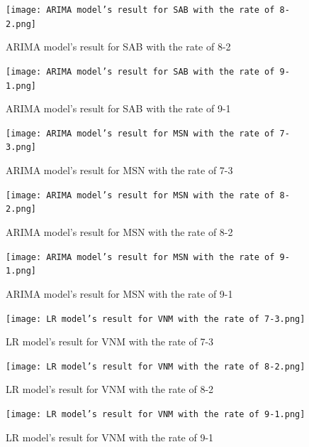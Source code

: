 \documentclass{ieeeojies}
\begin{document}
   \begin{figure}[H]
    \centering
    \begin{minipage}{0.23\textwidth}
    \centering
    \texttt{[image: ARIMA model’s result for SAB with the rate of 8-2.png]}
    \caption{ARIMA model’s result for SAB with the rate of 8-2}
    \end{minipage}
    \hfill
    \begin{minipage}{0.23\textwidth}
    \centering
    \texttt{[image: ARIMA model’s result for SAB with the rate of 9-1.png]}
    \caption{ARIMA model’s result for SAB with the rate of 9-1}
    \end{minipage}
    \end{figure}
    \begin{figure}[H]
    \begin{minipage}{0.23\textwidth}
    \centering
    \texttt{[image: ARIMA model’s result for MSN with the rate of 7-3.png]}
    \caption{ARIMA model’s result for MSN with the rate of 7-3}
    \end{minipage}
    \hfill
    \begin{minipage}{0.23\textwidth}
    \centering
    \texttt{[image: ARIMA model’s result for MSN with the rate of 8-2.png]}
    \caption{ARIMA model’s result for MSN with the rate of 8-2}
    \end{minipage}
   \end{figure}

   \begin{figure}[H]
    \centering
    \begin{minipage}{0.23\textwidth}
    \centering
    \texttt{[image: ARIMA model’s result for MSN with the rate of 9-1.png]}
    \caption{ARIMA model’s result for MSN with the rate of 9-1}
    \end{minipage}
    \hfill
    \begin{minipage}{0.23\textwidth}
    \centering
    \texttt{[image: LR model’s result for VNM with the rate of 7-3.png]}
    \caption{LR model’s result for VNM with the rate of 7-3}
    \end{minipage}
    \end{figure}
    \begin{figure}[H]
    \begin{minipage}{0.23\textwidth}
    \centering
    \texttt{[image: LR model’s result for VNM with the rate of 8-2.png]}
    \caption{LR model’s result for VNM with the rate of 8-2}
    \end{minipage}
    \hfill
    \begin{minipage}{0.23\textwidth}
    \centering
    \texttt{[image: LR model’s result for VNM with the rate of 9-1.png]}
    \caption{LR model’s result for VNM with the rate of 9-1}
    \end{minipage}
   \end{figure}
   
\end{document}

